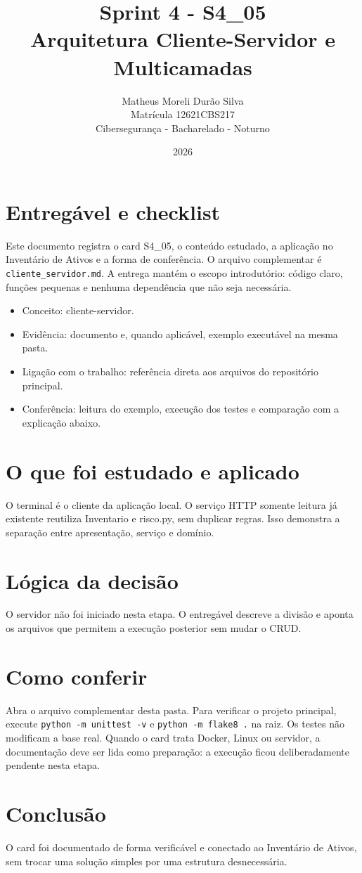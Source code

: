\documentclass[12pt]{article}
\title{Sprint 4 - S4\_05\\Arquitetura Cliente-Servidor e Multicamadas}
\author{Matheus Moreli Durão Silva\\ Matrícula 12621CBS217\\ Cibersegurança - Bacharelado - Noturno}
\date{2026}
\begin{document}
\maketitle

\section*{Entregável e checklist}
Este documento registra o card S4\_05, o conteúdo estudado, a aplicação no Inventário de Ativos e a forma de conferência. O arquivo complementar é \texttt{cliente\_servidor.md}. A entrega mantém o escopo introdutório: código claro, funções pequenas e nenhuma dependência que não seja necessária.

\begin{itemize}
\item Conceito: cliente-servidor.
\item Evidência: documento e, quando aplicável, exemplo executável na mesma pasta.
\item Ligação com o trabalho: referência direta aos arquivos do repositório principal.
\item Conferência: leitura do exemplo, execução dos testes e comparação com a explicação abaixo.
\end{itemize}

\section*{O que foi estudado e aplicado}
O terminal é o cliente da aplicação local. O serviço HTTP somente leitura já existente reutiliza Inventario e risco.py, sem duplicar regras. Isso demonstra a separação entre apresentação, serviço e domínio.

\section*{Lógica da decisão}
O servidor não foi iniciado nesta etapa. O entregável descreve a divisão e aponta os arquivos que permitem a execução posterior sem mudar o CRUD.

\section*{Como conferir}
Abra o arquivo complementar desta pasta. Para verificar o projeto principal, execute \texttt{python -m unittest -v} e \texttt{python -m flake8 .} na raiz. Os testes não modificam a base real. Quando o card trata Docker, Linux ou servidor, a documentação deve ser lida como preparação: a execução ficou deliberadamente pendente nesta etapa.

\section*{Conclusão}
O card foi documentado de forma verificável e conectado ao Inventário de Ativos, sem trocar uma solução simples por uma estrutura desnecessária.
\end{document}
